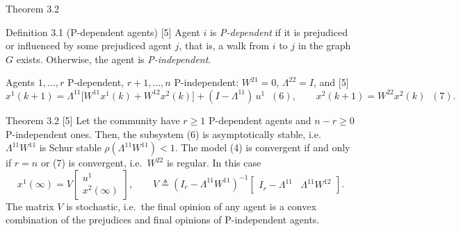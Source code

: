 \begin{frame}[label=bk-fj-thm]{Theorem 3.2}
  \scriptsize
  \begin{block}{Definition 3.1 (P-dependent agents) [5]}
    Agent $i$ is \emph{P-dependent} if it is prejudiced or influenced by some prejudiced
    agent $j$, that is, a walk from $i$ to $j$ in the graph $G$ exists. Otherwise, the agent
    is \emph{P-independent}.
  \end{block}
  Agents $1, \dots, r$ P-dependent, $r+1, \dots, n$ P-independent: $W^{21} = 0$,
  $\Lambda^{22} = I$, and [5]
  \[
    x^1(k+1) = \Lambda^{11}\bigl[W^{11} x^1(k) + W^{12} x^2(k)\bigr]
               + (I - \Lambda^{11})\, u^1 \;\; (6), \qquad
    x^2(k+1) = W^{22} x^2(k) \;\; (7).
  \]
  \begin{block}{Theorem 3.2 [5]}
    Let the community have $r \geq 1$ P-dependent agents and $n - r \geq 0$ P-independent
    ones. Then, the subsystem (6) is asymptotically stable, i.e.\ $\Lambda^{11} W^{11}$ is
    Schur stable $\rho(\Lambda^{11} W^{11}) < 1$. The model (4) is convergent if and only if
    $r = n$ or (7) is convergent, i.e.\ $W^{22}$ is regular. In this case
    \[
      x^1(\infty) = V \begin{bmatrix} u^1 \\ x^2(\infty) \end{bmatrix}, \qquad
      V \triangleq (I_r - \Lambda^{11} W^{11})^{-1}
          \begin{bmatrix} I_r - \Lambda^{11} & \Lambda^{11} W^{12} \end{bmatrix}.
    \]
    The matrix $V$ is stochastic, i.e.\ the final opinion of any agent is a convex
    combination of the prejudices and final opinions of P-independent agents.
  \end{block}
\end{frame}

